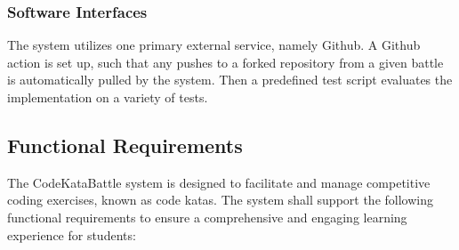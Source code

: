 \subsubsection{Software Interfaces}
The system utilizes one primary external service, namely Github. A Github action is set up, such that any pushes to a forked repository from a given battle is automatically pulled by the system. Then a predefined test script evaluates the implementation on a variety of tests.  

\subsection{Functional Requirements}
\label{sec:functional_requirements}

The CodeKataBattle system is designed to facilitate and manage competitive coding exercises, known as code katas. The system shall support the following functional requirements to ensure a comprehensive and engaging learning experience for students:

